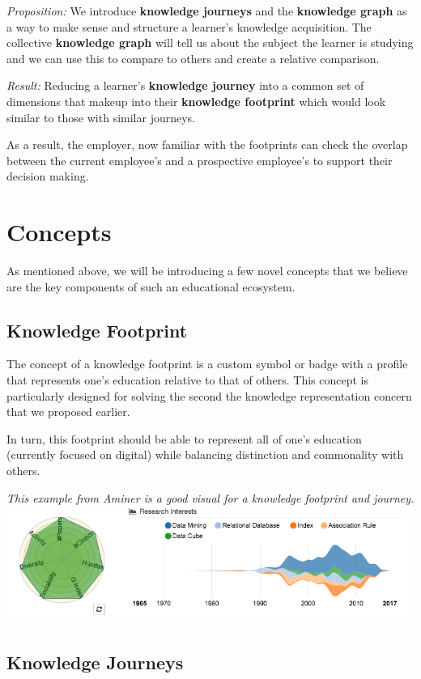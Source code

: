 \documentclass{acm_proc_article-sp}
\begin{document}
\emph{Proposition:} We introduce \textbf{knowledge journeys} and the
\textbf{knowledge graph} as a way to make sense and structure a
learner's knowledge acquisition. The collective \textbf{knowledge graph}
will tell us about the subject the learner is studying and we can use
this to compare to others and create a relative comparison.

\emph{Result:} Reducing a learner's \textbf{knowledge journey} into a
common set of dimensions that makeup into their \textbf{knowledge
footprint} which would look similar to those with similar journeys.

As a result, the employer, now familiar with the footprints can check
the overlap between the current employee's and a prospective employee's
to support their decision making.

\section{Concepts}\label{concepts}

As mentioned above, we will be introducing a few novel concepts that we
believe are the key components of such an educational ecosystem.

\subsection{Knowledge Footprint}\label{knowledge-footprint}

The concept of a knowledge footprint is a custom symbol or badge with a
profile that represents one's education relative to that of others. This
concept is particularly designed for solving the second the knowledge
representation concern that we proposed earlier.

In turn, this footprint should be able to represent all of one's
education (currently focused on digital) while balancing distinction and
commonality with others.

\emph{This example from Aminer is a good visual for a knowledge
footprint and journey.} \includegraphics{img/aminer.png}

\subsection{Knowledge Journeys}\label{knowledge-journeys}
\end{document}
